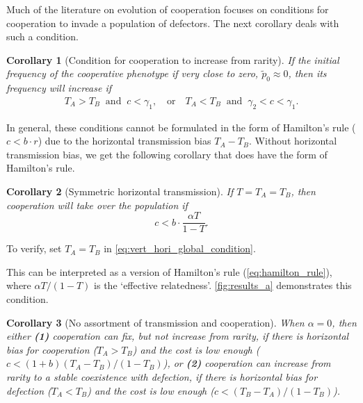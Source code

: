 \documentclass[12pt]{extarticle}
\newtheorem{corollary}{Corollary}
\begin{document}
{\begin{enumerate}
Much of the literature on evolution of cooperation focuses on conditions for cooperation to invade a population of defectors.
The next corollary deals with such a condition.
\\
\end{enumerate}

\begin{corollary}[Condition for cooperation to increase from rarity]
If the initial frequency of the cooperative phenotype if very close to zero, $\tilde{p}_0 \approx 0$, then its frequency will increase if 
\begin{equation} \label{eq:unequal_transmission_from_rarity}
\begin{aligned}
T_A>T_B \;\; \text{and} \;\; c < \gamma_1, \quad \text{or} \quad
T_A<T_B \;\; \text{and} \;\; \gamma_2<c < \gamma_1. 
\end{aligned}
\end{equation} 
\end{corollary}

In general, these conditions cannot be formulated in the form of Hamilton's rule ($c<b\cdot r$) due to the horizontal transmission bias $T_A-T_B$.
Without horizontal transmission bias, we get the following corollary that does have the form of Hamilton's rule.\\

\begin{corollary}[Symmetric horizontal transmission]
If $T=T_A=T_B$, then cooperation will take over the population if
\begin{equation}
\label{eq:equal_transmission}
c < b \cdot \frac{\alpha T}{1-T}.
\end{equation}
\end{corollary}
To verify, set $T_A=T_B$ in \autoref{eq:vert_hori_global_condition}.

This can be interpreted as a version of Hamilton's rule (\autoref{eq:hamilton_rule}), where $\alpha T/(1-T)$ is the `effective relatedness'.
\autoref{fig:results_a} demonstrates this condition. 
\\

\begin{corollary}[No assortment of transmission and cooperation]
When $\alpha=0$, then either
\textbf{(1)} cooperation can fix, but not increase from rarity, if there is horizontal bias for cooperation ($T_A>T_B$) and the cost is low enough ($c<(1+b)(T_A-T_B)/(1-T_B)$), or 
\textbf{(2)} cooperation can increase from rarity to a stable coexistence with defection, if there is horizontal bias for defection ($T_A<T_B$) and the cost is low enough ($c<(T_B-T_A)/(1-T_B)$).
\end{corollary}

}
\end{document}
